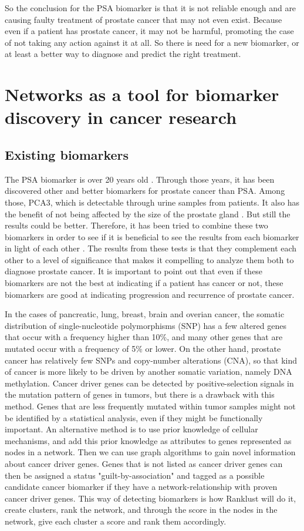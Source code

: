 So the conclusion for the PSA biomarker is that it is not reliable enough and
are causing faulty treatment of prostate cancer that may not even exist. Because
even if a patient has prostate cancer, it may not be harmful, promoting the case
of not taking any action against it at all. So there is need for a new
biomarker, or at least a better way to diagnose and predict the right treatment.

\chapter{Networks as a tool for biomarker discovery in cancer research}
\section{Existing biomarkers}
The PSA biomarker is over 20 years old \cite{psa-age}. Through those years, it
has been discovered other and better biomarkers for prostate cancer than PSA.
Among those, PCA3, which is detectable through urine samples from patients. It
also has the benefit of not being affected by the size of the prostate gland
\cite{pca3-size}. But still the results could be better. Therefore, it has been
tried to combine these two biomarkers in order to see if it is beneficial to see
the results from each biomarker in light of each other \cite{beyondpsa}. The
results from these tests is that they complement each other to a level of
significance that makes it compelling to analyze them both to diagnose prostate
cancer. It is important to point out that even if these biomarkers are not the
best at indicating if a patient has cancer or not, these biomarkers are good at
indicating progression and recurrence of prostate cancer.

In the cases of pancreatic, lung, breast, brain and overian cancer, the somatic
distribution of single-nucleotide polymorphisms (SNP) has a few altered genes
that occur with a frequency higher than 10\%, and many other genes that are
mutated occur with a frequency of 5\% or lower\cite{pathway-network}. On the
other hand, prostate cancer has relatively few SNPs and copy-number alterations
(CNA), so that kind of cancer is more likely to be driven by another somatic
variation, namely DNA methylation. Cancer driver genes can be detected by
positive-selection signals in the mutation pattern of genes in tumors, but there
is a drawback with this method. Genes that are less frequently mutated within
tumor samples might not be identified by a statistical analysis, even if they
might be functionally important. An alternative method is to use prior knowledge
of cellular mechanisms, and add this prior knowledge as attributes to genes
represented as nodes in a network. Then we can use graph algorithms to gain
novel information about cancer driver genes. Genes that is not listed as cancer
driver genes can then be assigned a status "guilt-by-association" and tagged as
a possible candidate cancer biomarker if they have a network-relationship with
proven cancer driver genes. This way of detecting biomarkers is how Ranklust
will do it, create clusters, rank the network, and through the score in the
nodes in the network, give each cluster a score and rank them accordingly.

